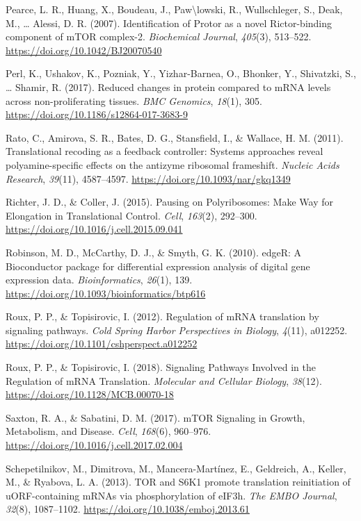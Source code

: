 \documentclass[12pt,openany]{book}
\begin{document}
\hypertarget{ref-Pearce2007}{}
Pearce, L. R., Huang, X., Boudeau, J., Paw\textbackslash{}lowski, R.,
Wullschleger, S., Deak, M., \ldots{} Alessi, D. R. (2007).
Identification of Protor as a novel Rictor-binding component of mTOR
complex-2. \emph{Biochemical Journal}, \emph{405}(3), 513--522.
\url{https://doi.org/10.1042/BJ20070540}

\hypertarget{ref-Perl2017}{}
Perl, K., Ushakov, K., Pozniak, Y., Yizhar-Barnea, O., Bhonker, Y.,
Shivatzki, S., \ldots{} Shamir, R. (2017). Reduced changes in protein
compared to mRNA levels across non-proliferating tissues. \emph{BMC
Genomics}, \emph{18}(1), 305.
\url{https://doi.org/10.1186/s12864-017-3683-9}

\hypertarget{ref-Rato2011}{}
Rato, C., Amirova, S. R., Bates, D. G., Stansfield, I., \& Wallace, H.
M. (2011). Translational recoding as a feedback controller: Systems
approaches reveal polyamine-specific effects on the antizyme ribosomal
frameshift. \emph{Nucleic Acids Research}, \emph{39}(11), 4587--4597.
\url{https://doi.org/10.1093/nar/gkq1349}

\hypertarget{ref-Richter2015}{}
Richter, J. D., \& Coller, J. (2015). Pausing on Polyribosomes: Make Way
for Elongation in Translational Control. \emph{Cell}, \emph{163}(2),
292--300. \url{https://doi.org/10.1016/j.cell.2015.09.041}

\hypertarget{ref-Robinson2010}{}
Robinson, M. D., McCarthy, D. J., \& Smyth, G. K. (2010). edgeR: A
Bioconductor package for differential expression analysis of digital
gene expression data. \emph{Bioinformatics}, \emph{26}(1), 139.
\url{https://doi.org/10.1093/bioinformatics/btp616}

\hypertarget{ref-Roux2012}{}
Roux, P. P., \& Topisirovic, I. (2012). Regulation of mRNA translation
by signaling pathways. \emph{Cold Spring Harbor Perspectives in
Biology}, \emph{4}(11), a012252.
\url{https://doi.org/10.1101/cshperspect.a012252}

\hypertarget{ref-Roux2018}{}
Roux, P. P., \& Topisirovic, I. (2018). Signaling Pathways Involved in
the Regulation of mRNA Translation. \emph{Molecular and Cellular
Biology}, \emph{38}(12). \url{https://doi.org/10.1128/MCB.00070-18}

\hypertarget{ref-Saxton2017}{}
Saxton, R. A., \& Sabatini, D. M. (2017). mTOR Signaling in Growth,
Metabolism, and Disease. \emph{Cell}, \emph{168}(6), 960--976.
\url{https://doi.org/10.1016/j.cell.2017.02.004}

\hypertarget{ref-Schepetilnikov2013}{}
Schepetilnikov, M., Dimitrova, M., Mancera-Martínez, E., Geldreich, A.,
Keller, M., \& Ryabova, L. A. (2013). TOR and S6K1 promote translation
reinitiation of uORF-containing mRNAs via phosphorylation of eIF3h.
\emph{The EMBO Journal}, \emph{32}(8), 1087--1102.
\url{https://doi.org/10.1038/emboj.2013.61}
\end{document}
